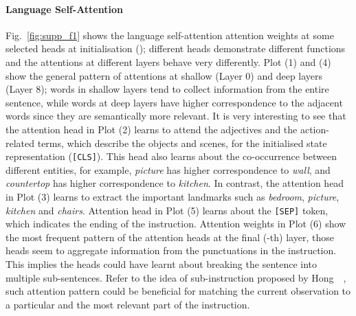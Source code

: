 \documentclass[final]{cvpr}
\begin{document}
\paragraph{Language Self-Attention}
Fig.~\ref{fig:supp_f1} shows the language self-attention attention weights at some selected heads at initialisation (); different heads demonstrate different functions and the attentions at different layers behave very differently. Plot (1) and (4) show the general pattern of attentions at shallow (Layer 0) and deep layers (Layer 8); words in shallow layers tend to collect information from the entire sentence, while words at deep layers have higher correspondence to the adjacent words since they are semantically more relevant. It is very interesting to see that the attention head in Plot (2) learns to attend the adjectives and the action-related terms, which describe the objects and scenes, for the initialised state representation (\texttt{[CLS]}). This head also learns about the co-occurrence between different entities, for example, \textit{picture} has higher correspondence to \textit{wall}, and \textit{countertop} has higher correspondence to \textit{kitchen}. In contrast, the attention head in Plot (3) learns to extract the important landmarks such as \textit{bedroom}, \textit{picture}, \textit{kitchen} and \textit{chairs}. Attention head in Plot (5) learns about the \texttt{[SEP]} token, which indicates the ending of the instruction. Attention weights in Plot (6) show the most frequent pattern of the attention heads at the final (-th) layer, those heads seem to aggregate information from the punctuations in the instruction. This implies the heads could have learnt about breaking the sentence into multiple sub-sentences. Refer to the idea of sub-instruction proposed by Hong~\etal~\cite{hong-etal-2020-sub}, such attention pattern could be beneficial for matching the current observation to a particular and the most relevant part of the instruction.
\end{document}
